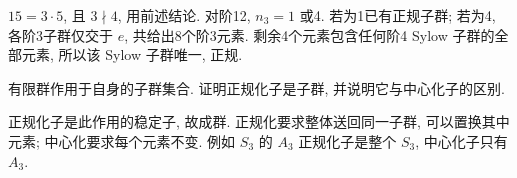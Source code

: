 \begin{solution}
$15=3\cdot5$, 且 $3\nmid4$, 用前述结论. 对阶12, $n_3=1$ 或4. 若为1已有正规子群; 若为4, 各阶3子群仅交于 $e$, 共给出8个阶3元素. 剩余4个元素包含任何阶4 Sylow 子群的全部元素, 所以该 Sylow 子群唯一, 正规.
\end{solution}
\begin{exercise}有限群作用于自身的子群集合. 证明正规化子是子群, 并说明它与中心化子的区别.\end{exercise}
\begin{solution}
正规化子是此作用的稳定子, 故成群. 正规化要求整体送回同一子群, 可以置换其中元素; 中心化要求每个元素不变. 例如 $S_3$ 的 $A_3$ 正规化子是整个 $S_3$, 中心化子只有 $A_3$.
\end{solution}
